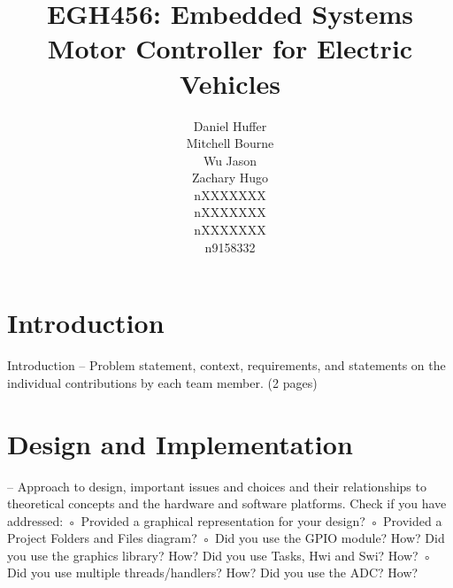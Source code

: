 \documentclass[titlepage]{article}
\begin{document}
\title{EGH456: Embedded Systems \\ Motor Controller for Electric Vehicles}

\author{\parbox{\textwidth}{\begin{multicols}{2}\begin{flushright}
Daniel Huffer \\ 
Mitchell Bourne \\ 
Wu Jason \\ 
Zachary Hugo
\end{flushright}\columnbreak\begin{flushleft}
nXXXXXXX \\ 
nXXXXXXX \\ 
nXXXXXXX \\ 
n9158332
\end{flushleft}\end{multicols}}}

\maketitle



\begin{abstract}
\end{abstract}

\tableofcontents
\listoffigures
\listoftables
\clearpage


\section{Introduction}
Introduction – Problem statement, context, requirements, and statements on the individual
contributions by each team member. (2 pages)



\section{Design and Implementation}
– Approach to design, important issues and choices and their
relationships to theoretical concepts and the hardware and software platforms. Check if you
have addressed:
◦ Provided a graphical representation for your design?
◦ Provided a Project Folders and Files diagram?
◦ Did you use the GPIO module? How? Did you use the graphics library? How? Did you
use Tasks, Hwi and Swi? How?
◦ Did you use multiple threads/handlers? How? Did you use the ADC? How?
\end{document}
